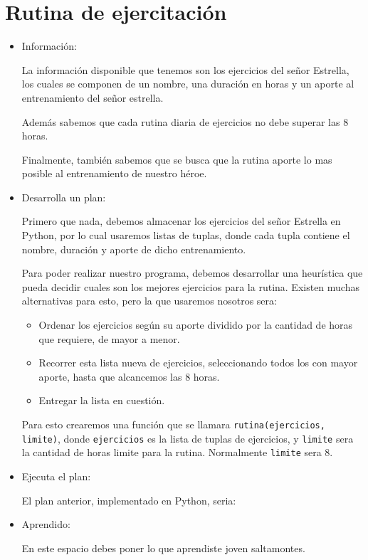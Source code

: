 \section{Rutina de ejercitación}

\begin{itemize}

\item Información:

La información disponible que tenemos son los ejercicios del señor Estrella, los cuales se componen de un nombre, una duración en horas y un aporte al entrenamiento del señor estrella.

Además sabemos que cada rutina diaria de ejercicios no debe superar las 8 horas.

Finalmente, también sabemos que se busca que la rutina aporte lo mas posible al entrenamiento de nuestro héroe.

\item Desarrolla un plan:

Primero que nada, debemos almacenar los ejercicios del señor Estrella en Python, por lo cual usaremos listas de tuplas, donde cada tupla contiene el nombre, duración y aporte de dicho entrenamiento.

Para poder realizar nuestro programa, debemos desarrollar una heurística que pueda decidir cuales son los mejores ejercicios para la rutina. Existen muchas alternativas para esto, pero la que usaremos nosotros sera: 
	\begin{itemize}
	\item Ordenar los ejercicios según su aporte dividido por la cantidad de horas que requiere, de mayor a menor.
	\item Recorrer esta lista nueva de ejercicios, seleccionando todos los con mayor aporte, hasta que alcancemos las 8 horas.
	\item Entregar la lista en cuestión.
	\end{itemize}

Para esto crearemos una función que se llamara \texttt{rutina(ejercicios, limite)}, donde \texttt{ejercicios} es la lista de tuplas de ejercicios, y \texttt{limite} sera la cantidad de horas limite para la rutina. Normalmente \texttt{limite} sera 8.

\item Ejecuta el plan:

El plan anterior, implementado en Python, seria:



\item Aprendido:

En este espacio debes poner lo que aprendiste joven saltamontes.

\end{itemize}
